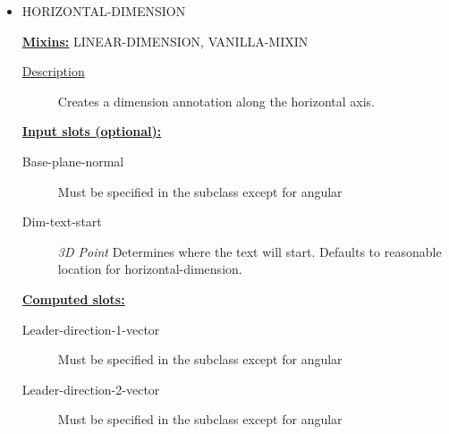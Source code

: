 \documentclass [11pt]{book}
\begin{document}
\begin{itemize}
\begin{description}
\end{description}







\item {}HORIZONTAL-DIMENSION


\textbf{
\underline{Mixins:}} LINEAR-DIMENSION, VANILLA-MIXIN





\begin{description}

\item [
\underline{Description}]


Creates a dimension annotation along the horizontal axis.



\end{description}








\textbf{
\underline{Input slots (optional):}}

\begin{description}

\item [Base-plane-normal]
Must be specified in the subclass except for angular


\item [Dim-text-start]
\emph{3D Point} Determines where the text will start. Defaults to reasonable location for
horizontal-dimension.


\end{description}






\textbf{
\underline{Computed slots:}}

\begin{description}

\item [Leader-direction-1-vector]
Must be specified in the subclass except for angular


\item [Leader-direction-2-vector]
Must be specified in the subclass except for angular



\end{description}
\end{itemize}
\end{document}
